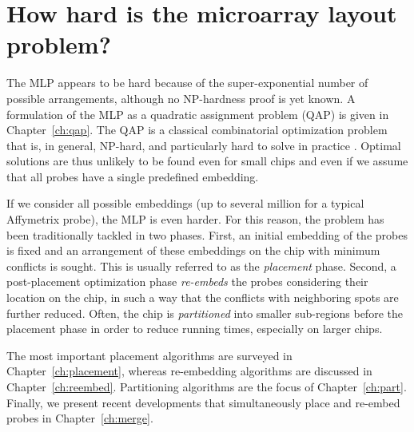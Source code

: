 \section{How hard is the microarray layout problem?}
\label{sec:mlp_how_hard}

The MLP appears to be hard because of the super-exponential number of possible
arrangements, although no NP-hardness proof is yet known. A formulation of the
MLP as a quadratic assignment problem (QAP) is given in Chapter~\ref{ch:qap}.
The QAP is a classical combinatorial optimization problem that is, in general,
NP-hard, and particularly hard to solve in practice \citep{Cela1997}. Optimal
solutions are thus unlikely to be found even for small chips and even if we
assume that all probes have a single predefined embedding.

If we consider all possible embeddings (up to several million for a typical
Affymetrix probe), the MLP is even harder. For this reason, the problem has been
traditionally tackled in two phases. First, an initial embedding of the probes
is fixed and an arrangement of these embeddings on the chip with minimum
conflicts is sought. This is usually referred to as the \emph{placement} phase.
Second, a post-placement optimization phase \emph{re-embeds} the probes
considering their location on the chip, in such a way that the conflicts with
neighboring spots are further reduced. Often, the chip is \emph{partitioned}
into smaller sub-regions before the placement phase in order to reduce running
times, especially on larger chips.

The most important placement algorithms are surveyed in
Chapter~\ref{ch:placement}, whereas re-embedding algorithms are discussed in
Chapter~\ref{ch:reembed}. Partitioning algorithms are the focus of
Chapter~\ref{ch:part}. Finally, we present recent developments that
simultaneously place and re-embed probes in Chapter~\ref{ch:merge}.
